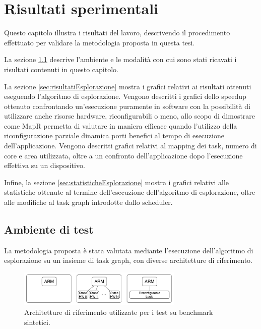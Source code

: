 \chapter{Risultati sperimentali}
\label{chap:risultati}
\vspace{1cm}
Questo capitolo illustra i risultati del lavoro, descrivendo
il procedimento effettuato per validare la metodologia proposta
in questa tesi.

La sezione \ref{sec:ambienteTest} descrive l'ambiente e le
modalit\`a con cui sono stati ricavati i risultati contenuti
in questo capitolo.

La sezione \ref{sec:risultatiEsplorazione} mostra i grafici relativi
ai risultati ottenuti eseguendo l'algoritmo di esplorazione.
Vengono descritti i grafici dello speedup ottenuto
confrontando un'esecuzione puramente in software con la possibilit\`a
di utilizzare anche risorse hardware, riconfigurabili o meno, allo
scopo di dimostrare come MapR permetta di valutare in maniera efficace
quando l'utilizzo della riconfigurazione parziale dinamica porti benefici al
tempo di esecuzione dell'applicazione. Vengono descritti grafici relativi
al mapping dei task, numero di core e area utilizzata, oltre a un confronto
dell'applicazione dopo l'esecuzione effettiva su un dispositivo.

Infine, la sezione \ref{sec:statisticheEsplorazione} mostra i grafici relativi
alle statistiche ottenute al termine dell'esecuzione dell'algoritmo di esplorazione,
oltre alle modifiche al task graph introdotte dallo scheduler.

\newpage

\section{Ambiente di test}
\label{sec:ambienteTest}

La metodologia proposta \`e stata valutata mediante l'esecuzione
dell'algoritmo di esplorazione su un insieme di task graph,
con diverse architetture di riferimento.


\begin{figure}[t]
  \begin{center}
    \includegraphics[width=0.7\textwidth]{./capitoli/figure/cap6/templates.pdf}
    \caption{Architetture di riferimento utilizzate per i test su benchmark sintetici.}
    \label{fig:architettureTestSintetici}
  \end{center}
\end{figure}

